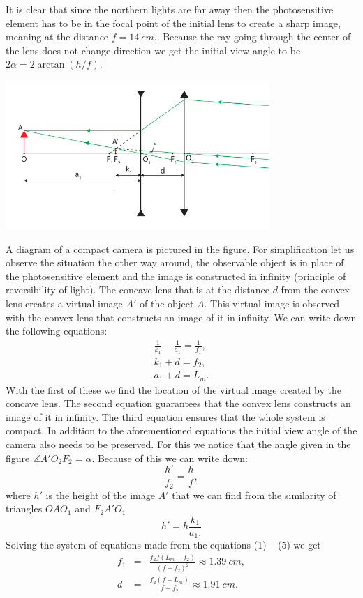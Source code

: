 {\ifEngSolution
It is clear that since the northern lights are far away then the photosensitive element has to be in the focal point of the initial lens to create a sharp image, meaning at the distance $f=\SI{14}{cm}.$. Because the ray going through the center of the lens does not change direction we get the initial view angle to be $2\alpha=2\arctan\left(h/f\right)$.
\begin{center}
	\includegraphics[width=10cm]{2017-v3g-08-skeem__telephoto}
\end{center}
A diagram of a compact camera is pictured in the figure. For simplification let us observe the situation the other way around, the observable object is in place of the photosensitive element and the image is constructed in infinity (principle of reversibility of light). The concave lens that is at the distance $d$ from the convex lens creates a virtual image $A'$ of the object $A$. This virtual image is observed with the convex lens that constructs an image of it in infinity. We can write down the following equations:
\begin{eqnarray}
\frac{1}{k_{1}}-\frac{1}{a_{1}} = \frac{1}{f_{1}}, \label{2017-v3g-08-eq:telelens-eq1}\\
k_{1}+d = f_{2},\\
a_{1}+d = L_{m}.
\end{eqnarray}
With the first of these we find the location of the virtual image created by the concave lens. The second equation guarantees that the convex lens constructs an image of it in infinity. The third equation ensures that the whole system is compact. In addition to the aforementioned equations the initial view angle of the camera also needs to be preserved. For this we notice that the angle given in the figure $\measuredangle A'O_{2}F_{2}=\alpha$. Because of this we can write down:
\begin{equation}
\frac{h'}{f_{2}}=\frac{h}{f},
\end{equation}
where $h'$ is the height of the image $A'$ that we can find from the similarity of triangles $OAO_{1}$ and $F_{2}A'O_{1}$
\begin{equation}
h'=h\frac{k_{1}}{a_{1}.}\label{2017-v3g-08-eq:telelens-eq2}
\end{equation}
Solving the system of equations made from the equations (1) – (5) we get
\begin{eqnarray*}
f_{1} & = & \frac{f_{2}f(L_{m}-f_{2})}{\left(f-f_{2}\right)^{2}}\approx\SI{1.39}{cm},\\
d & = & \frac{f_{2}(f-L_{m})}{f-f_{2}}\approx\SI{1.91}{cm}.
\end{eqnarray*}
\fi
}